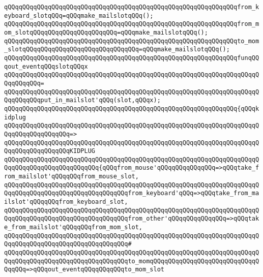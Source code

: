 \verb|qQQqqQQqqQQqqQQqqQQqqQQqqQQqqQQqqQQqqQQqqQQqqQQqqQQqqQQqqQQqqQQqfrom_keyboard_slotqQQq=qQQqmake_mailslotqQQq();|\newline
\verb|qQQqqQQqqQQqqQQqqQQqqQQqqQQqqQQqqQQqqQQqqQQqqQQqqQQqqQQqqQQqqQQqfrom_mom_slotqQQqqQQqqQQqqQQqqQQqqQQq=qQQqmake_mailslotqQQq();|\newline
\verb|qQQqqQQqqQQqqQQqqQQqqQQqqQQqqQQqqQQqqQQqqQQqqQQqqQQqqQQqqQQqqQQqto_mom_slotqQQqqQQqqQQqqQQqqQQqqQQqqQQqqQQq=qQQqmake_mailslotqQQq();|\newline
\newline
\verb|qQQqqQQqqQQqqQQqqQQqqQQqqQQqqQQqqQQqqQQqqQQqqQQqqQQqqQQqqQQqqQQqfunqQQqout_eventqQQqslotqQQqx|\newline
\verb|qQQqqQQqqQQqqQQqqQQqqQQqqQQqqQQqqQQqqQQqqQQqqQQqqQQqqQQqqQQqqQQqqQQqqQQqqQQqqQQq=|\newline
\verb|qQQqqQQqqQQqqQQqqQQqqQQqqQQqqQQqqQQqqQQqqQQqqQQqqQQqqQQqqQQqqQQqqQQqqQQqqQQqqQQqput_in_mailslot'qQQq(slot,qQQqx);|\newline
\newline
\verb|qQQqqQQqqQQqqQQqqQQqqQQqqQQqqQQqqQQqqQQqqQQqqQQqqQQqqQQqqQQqqQQq{qQQqkidplug|\newline
\verb|qQQqqQQqqQQqqQQqqQQqqQQqqQQqqQQqqQQqqQQqqQQqqQQqqQQqqQQqqQQqqQQqqQQqqQQqqQQqqQQqqQQqqQQq=>|\newline
\verb|qQQqqQQqqQQqqQQqqQQqqQQqqQQqqQQqqQQqqQQqqQQqqQQqqQQqqQQqqQQqqQQqqQQqqQQqqQQqqQQqqQQqqQQqKIDPLUG|\newline
\verb|qQQqqQQqqQQqqQQqqQQqqQQqqQQqqQQqqQQqqQQqqQQqqQQqqQQqqQQqqQQqqQQqqQQqqQQqqQQqqQQqqQQqqQQqqQQqqQQq{qQQqfrom_mouse'qQQqqQQqqQQqqQQq=>qQQqtake_from_mailslot'qQQqqQQqfrom_mouse_slot,|\newline
\verb|qQQqqQQqqQQqqQQqqQQqqQQqqQQqqQQqqQQqqQQqqQQqqQQqqQQqqQQqqQQqqQQqqQQqqQQqqQQqqQQqqQQqqQQqqQQqqQQqqQQqqQQqfrom_keyboard'qQQq=>qQQqtake_from_mailslot'qQQqqQQqfrom_keyboard_slot,|\newline
\verb|qQQqqQQqqQQqqQQqqQQqqQQqqQQqqQQqqQQqqQQqqQQqqQQqqQQqqQQqqQQqqQQqqQQqqQQqqQQqqQQqqQQqqQQqqQQqqQQqqQQqqQQqfrom_other'qQQqqQQqqQQqqQQq=>qQQqtake_from_mailslot'qQQqqQQqfrom_mom_slot,|\newline
\verb|qQQqqQQqqQQqqQQqqQQqqQQqqQQqqQQqqQQqqQQqqQQqqQQqqQQqqQQqqQQqqQQqqQQqqQQqqQQqqQQqqQQqqQQqqQQqqQQqqQQqqQQq#|\newline
\verb|qQQqqQQqqQQqqQQqqQQqqQQqqQQqqQQqqQQqqQQqqQQqqQQqqQQqqQQqqQQqqQQqqQQqqQQqqQQqqQQqqQQqqQQqqQQqqQQqqQQqqQQqto_momqQQqqQQqqQQqqQQqqQQqqQQqqQQqqQQqqQQq=>qQQqout_eventqQQqqQQqqQQqto_mom_slot|\newline

